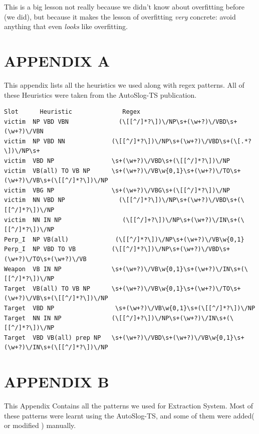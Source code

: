 \documentclass[11pt]{myclass}
\begin{document}
This is a big lesson not really because we didn't know about overfitting before (we did), but because it makes the lesson of overfitting \textit{very} concrete: avoid anything that even \textit{looks} like overfitting.













\section*{APPENDIX A}

This appendix lists all the heuristics we used along with regex patterns.  
All of these Heuristics were taken from the AutoSlog-TS publication.

\begin{verbatim}
Slot 	  Heuristic 	         Regex 
victim 	NP VBD VBN           	(\[[^/]*?\])\/NP\s+(\w+?)\/VBD\s+(\w+?)\/VBN
victim  NP VBD NN             (\[[^/]*?\])\/NP\s+(\w+?)\/VBD\s+(\[.*?\])\/NP\s+
victim  VBD NP                \s+(\w+?)\/VBD\s+(\[[^/]*?\])\/NP
victim  VB(all) TO VB NP      \s+(\w+?)\/VB\w{0,1}\s+(\w+?)\/TO\s+(\w+?)\/VB\s+(\[[^/]*?\])\/NP
victim  VBG NP                \s+(\w+?)\/VBG\s+(\[[^/]*?\])\/NP
victim  NN VBD NP	            (\[[^/]*?\])\/NP\s+(\w+?)\/VBD\s+(\[[^/]*?\])\/NP
victim  NN IN NP	             (\[[^/]+?\])\/NP\s+(\w+?)\/IN\s+(\[[^/]*?\])\/NP
Perp_I  NP VB(all)	           (\[[^/]*?\])\/NP\s+(\w+?)\/VB\w{0,1}
Perp_I  NP VBD TO VB          (\[[^/]*?\])\/NP\s+(\w+?)\/VBD\s+(\w+?)\/TO\s+(\w+?)\/VB
Weapon  VB IN NP              \s+(\w+?)\/VB\w{0,1}\s+(\w+?)\/IN\s+(\[[^/]*?\])\/NP
Target  VB(all) TO VB NP      \s+(\w+?)\/VB\w{0,1}\s+(\w+?)\/TO\s+(\w+?)\/VB\s+(\[[^/]*?\])\/NP
Target  VBD NP	               \s+(\w+?)\/VB\w{0,1}\s+(\[[^/]*?\])\/NP
Target  NN IN NP              (\[[^/]+?\])\/NP\s+(\w+?)\/IN\s+(\[[^/]*?\])\/NP
Target  VBD VB(all) prep NP   \s+(\w+?)\/VBD\s+(\w+?)\/VB\w{0,1}\s+(\w+?)\/IN\s+(\[[^/]*?\])\/NP
\end{verbatim}

 



\section*{APPENDIX B}

This Appendix Contains all the patterns we used for Extraction System. Most of these patterns were learnt using the AutoSlog-TS, and some of them were added( or modified ) manually.
\end{document}
